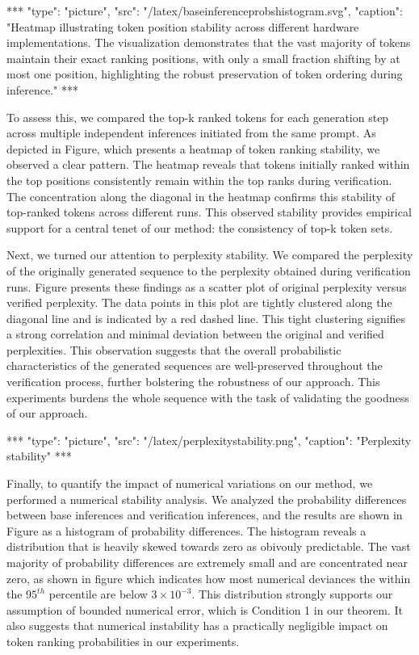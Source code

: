 \documentclass{article}
\begin{document}
\begin{center}
***
"type": "picture",
"src": "/latex/baseinferenceprobshistogram.svg",
"caption": "Heatmap illustrating token position stability across different hardware implementations. The visualization demonstrates that the vast majority of tokens maintain their exact ranking positions, with only a small fraction shifting by at most one position, highlighting the robust preservation of token ordering during inference."
***
\end{center}

To assess this, we compared the top-k ranked tokens for each generation step across multiple independent inferences initiated from the same prompt. As depicted in Figure, which presents a heatmap of token ranking stability, we observed a clear pattern. The heatmap reveals that tokens initially ranked within the top positions consistently remain within the top ranks during verification.  The concentration along the diagonal in the heatmap confirms this stability of top-ranked tokens across different runs. This observed stability provides empirical support for a central tenet of our method: the consistency of top-k token sets.

Next, we turned our attention to perplexity stability. We compared the perplexity of the originally generated sequence to the perplexity obtained during verification runs. Figure presents these findings as a scatter plot of original perplexity versus verified perplexity. The data points in this plot are tightly clustered along the diagonal line and is indicated by a red dashed line. This tight clustering signifies a strong correlation and minimal deviation between the original and verified perplexities. This observation suggests that the overall probabilistic characteristics of the generated sequences are well-preserved throughout the verification process, further bolstering the robustness of our approach.  This experiments burdens the whole sequence with the task of validating the goodness of our approach.

\begin{center}
***
"type": "picture",
"src": "/latex/perplexitystability.png",
"caption": "Perplexity stability"
***
\end{center}

Finally, to quantify the impact of numerical variations on our method, we performed a numerical stability analysis.  We analyzed the probability differences between base inferences and verification inferences, and the results are shown in Figure as a histogram of probability differences. The histogram reveals a distribution that is heavily skewed towards zero as obivouly predictable. The vast majority of probability differences are extremely small and are concentrated near zero, as shown in figure which indicates how most numerical deviances the within the $95^{th}$ percentile are below $3 \times 10^{-3}$. This distribution strongly supports our assumption of bounded numerical error, which is Condition 1 in our theorem. It also suggests that numerical instability has a practically negligible impact on token ranking probabilities in our experiments.
\end{document}
